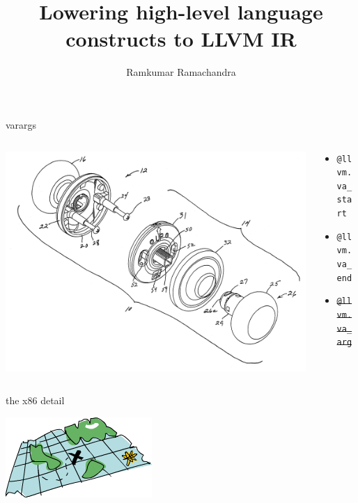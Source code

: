 \documentclass{beamer}
\title{Lowering high-level language constructs to LLVM IR}
\author{Ramkumar Ramachandra}
\begin{document}
\begin{frame}
  \titlepage
\end{frame}

\begin{frame}
  
  
\end{frame}

\begin{frame}
  
  
\end{frame}

\begin{frame}
  
  
\end{frame}

\begin{frame}{varargs}
  \begin{columns}
    \begin{column}[b]{5.5cm}
      \includegraphics[scale=0.05]{variable-knob}
    \end{column}
    \begin{column}[b]{4.5cm}
      \begin{itemize}
      \item[] \texttt{@llvm.va\_start}
      \item[] \texttt{@llvm.va\_end}
      \item[] \texttt{\sout{@llvm.va\_arg}}
      \end{itemize}
    \end{column}
  \end{columns}
\end{frame}

\begin{frame}{the x86 detail}
  
  \vfill
  
\end{frame}

\begin{frame}
  
  \begin{center}\includegraphics{map}\end{center}
\end{frame}
\end{document}
